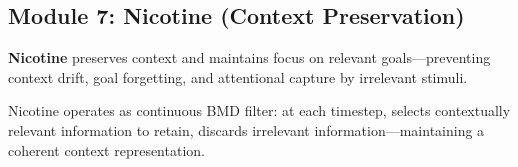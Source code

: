 \subsection{Module 7: Nicotine (Context Preservation)}

\begin{definition}
\textbf{Nicotine} preserves context and maintains focus on relevant goals—preventing context drift, goal forgetting, and attentional capture by irrelevant stimuli.
\end{definition}

\begin{theorem}
Nicotine operates as continuous BMD filter: at each timestep, selects contextually relevant information to retain, discards irrelevant information—maintaining a coherent context representation.
\end{theorem}

